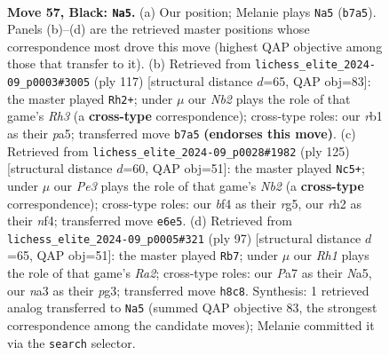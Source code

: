 \documentclass[11pt]{article}
\begin{document}
\clearpage

\begin{figure}[p]\centering
\begin{subfigure}{0.46\textwidth}\centering
\resizebox{\linewidth}{!}{%
\newchessgame
\chessboard[
  setfen={7r/pn6/1pr1p1kp/8/2PKPB2/N7/P5PR/1R6 b - - 8 57},
  showmover=false,
  pgfstyle=straightmove, color=movearrow, markmove={b7-a5}
]}
\caption{}
\end{subfigure}\hfill
\begin{subfigure}{0.46\textwidth}\centering
\resizebox{\linewidth}{!}{%
\newchessgame
\chessboard[
  setfen={4n3/2r2kp1/p1p4r/Pp4R1/1P1PB3/2R2P2/5K2/8 b - - 0 59},
  showmover=false,
  pgfstyle=straightmove, color=movearrow, markmove={h6-h2}
]}
\caption{}
\end{subfigure}
\\[4pt]
\begin{subfigure}{0.46\textwidth}\centering
\resizebox{\linewidth}{!}{%
\newchessgame
\chessboard[
  setfen={8/pn2r2k/1pr3p1/6Rp/1R2PN1P/P2K4/6P1/8 b - - 15 63},
  showmover=false,
  pgfstyle=straightmove, color=movearrow, markmove={b7-c5}
]}
\caption{}
\end{subfigure}\hfill
\begin{subfigure}{0.46\textwidth}\centering
\resizebox{\linewidth}{!}{%
\newchessgame
\chessboard[
  setfen={8/r4p2/2p3k1/n2p4/p2r1PB1/6P1/RP3PK1/2R5 b - - 1 49},
  showmover=false,
  pgfstyle=straightmove, color=movearrow, markmove={a7-b7}
]}
\caption{}
\end{subfigure}
\caption{\textbf{Move 57, Black: \texttt{Na5}.} (a) Our position; Melanie plays \texttt{Na5} (\texttt{b7a5}). Panels (b)--(d) are the retrieved master positions whose correspondence most drove this move (highest QAP objective among those that transfer to it). (b) Retrieved from \texttt{lichess\_elite\_2024-09\_p0003\#3005} (ply 117) [structural distance $d$=65, QAP obj=83]: the master played \texttt{Rh2+}; under $\mu$ our \emph{Nb2} plays the role of that game's \emph{Rh3} (a \textbf{cross-type} correspondence); cross-type roles: our \emph{r}b1 as their \emph{p}a5; transferred move \texttt{b7a5} \textbf{(endorses this move)}. (c) Retrieved from \texttt{lichess\_elite\_2024-09\_p0028\#1982} (ply 125) [structural distance $d$=60, QAP obj=51]: the master played \texttt{Nc5+}; under $\mu$ our \emph{Pe3} plays the role of that game's \emph{Nb2} (a \textbf{cross-type} correspondence); cross-type roles: our \emph{b}f4 as their \emph{r}g5, our \emph{r}h2 as their \emph{n}f4; transferred move \texttt{e6e5}. (d) Retrieved from \texttt{lichess\_elite\_2024-09\_p0005\#321} (ply 97) [structural distance $d$=65, QAP obj=51]: the master played \texttt{Rb7}; under $\mu$ our \emph{Rh1} plays the role of that game's \emph{Ra2}; cross-type roles: our \emph{P}a7 as their \emph{N}a5, our \emph{n}a3 as their \emph{p}g3; transferred move \texttt{h8c8}. Synthesis: 1 retrieved analog transferred to \texttt{Na5} (summed QAP objective 83, the strongest correspondence among the candidate moves); Melanie committed it via the \texttt{search} selector.}
\label{fig:thought-m113}
\end{figure}
\end{document}
